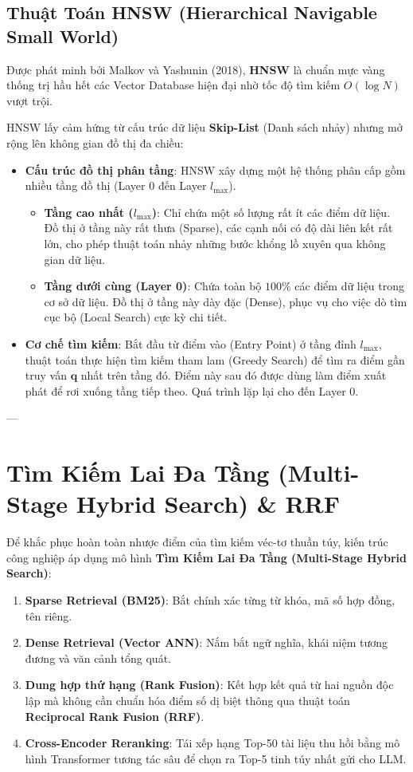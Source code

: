 \subsection{Thuật Toán HNSW (Hierarchical Navigable Small World)}
Được phát minh bởi Malkov và Yashunin (2018), \textbf{HNSW} là chuẩn mực vàng thống trị hầu hết các Vector Database hiện đại nhờ tốc độ tìm kiếm $O(\log N)$ vượt trội.

HNSW lấy cảm hứng từ cấu trúc dữ liệu \textbf{Skip-List} (Danh sách nhảy) nhưng mở rộng lên không gian đồ thị đa chiều:
\begin{itemize}
  \item \textbf{Cấu trúc đồ thị phân tầng}: HNSW xây dựng một hệ thống phân cấp gồm nhiều tầng đồ thị (Layer $0$ đến Layer $l_{\max}$).
  \begin{itemize}
    \item \textbf{Tầng cao nhất ($l_{\max}$)}: Chỉ chứa một số lượng rất ít các điểm dữ liệu. Đồ thị ở tầng này rất thưa (Sparse), các cạnh nối có độ dài liên kết rất lớn, cho phép thuật toán nhảy những bước khổng lồ xuyên qua không gian dữ liệu.
    \item \textbf{Tầng dưới cùng (Layer 0)}: Chứa toàn bộ $100\%$ các điểm dữ liệu trong cơ sở dữ liệu. Đồ thị ở tầng này dày đặc (Dense), phục vụ cho việc dò tìm cục bộ (Local Search) cực kỳ chi tiết.
  \end{itemize}
  \item \textbf{Cơ chế tìm kiếm}: Bắt đầu từ điểm vào (Entry Point) ở tầng đỉnh $l_{\max}$, thuật toán thực hiện tìm kiếm tham lam (Greedy Search) để tìm ra điểm gần truy vấn $\mathbf{q}$ nhất trên tầng đó. Điểm này sau đó được dùng làm điểm xuất phát để rơi xuống tầng tiếp theo. Quá trình lặp lại cho đến Layer 0.
\end{itemize}

---

\section{Tìm Kiếm Lai Đa Tầng (Multi-Stage Hybrid Search) \& RRF}
\label{sec:hybrid-search-rrf}

Để khắc phục hoàn toàn nhược điểm của tìm kiếm véc-tơ thuần túy, kiến trúc công nghiệp áp dụng mô hình \textbf{Tìm Kiếm Lai Đa Tầng (Multi-Stage Hybrid Search)}:
\begin{enumerate}
  \item \textbf{Sparse Retrieval (BM25)}: Bắt chính xác từng từ khóa, mã số hợp đồng, tên riêng.
  \item \textbf{Dense Retrieval (Vector ANN)}: Nắm bắt ngữ nghĩa, khái niệm tương đương và văn cảnh tổng quát.
  \item \textbf{Dung hợp thứ hạng (Rank Fusion)}: Kết hợp kết quả từ hai nguồn độc lập mà không cần chuẩn hóa điểm số dị biệt thông qua thuật toán \textbf{Reciprocal Rank Fusion (RRF)}.
  \item \textbf{Cross-Encoder Reranking}: Tái xếp hạng Top-50 tài liệu thu hồi bằng mô hình Transformer tương tác sâu để chọn ra Top-5 tinh túy nhất gửi cho LLM.
\end{enumerate}

